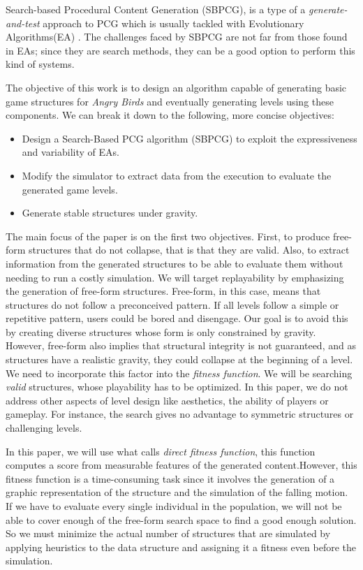 \documentclass[a4paper,twoside]{article}
\begin{document}
Search-based Procedural Content Generation (SBPCG), is a type of a \textit{generate-and-test} approach to PCG which is usually tackled with Evolutionary Algorithms(EA) \cite{togelius2010search}. The challenges faced by SBPCG are not far from those found in EAs; since they are search
methods, they can be a good option to perform this kind of systems. 


The objective of this work is to design an algorithm capable of
generating basic game structures for \textit{Angry Birds} and
eventually generating levels using these components. We can break it
down to the following, more concise objectives: 

\begin{itemize}
	\item Design a Search-Based PCG algorithm (SBPCG) to exploit the expressiveness and variability of EAs.
	\item Modify the simulator to extract data from the execution to evaluate the generated game levels.
	\item Generate stable structures under gravity.
\end{itemize} 


The main focus of the paper is on the first two objectives. First, to produce free-form structures that do not collapse, that is that they are valid. Also, to extract information from the generated structures to be able to evaluate them without needing to run a costly simulation.  We will target replayability by emphasizing the generation of free-form structures. Free-form, in this case, means that structures do not follow a preconceived pattern. If all levels follow a simple or repetitive pattern, users could be bored and disengage. Our goal is to avoid this by creating diverse structures whose form is only constrained by gravity. However, free-form also implies that structural integrity is not guaranteed, and as structures have a realistic gravity, they could collapse at the beginning of a level. We need to incorporate this factor into the \textit{fitness function}.  We will be searching { \em valid} structures, whose playability has to be optimized.  In this paper, we do not address other aspects of level design like aesthetics, the ability of players or gameplay. For instance, the search gives no advantage to symmetric structures or challenging levels.

In this paper, we will use what \cite{togelius2010search} calls {\em direct fitness function}, this function computes a score from measurable features of the generated content.However, this fitness function is a time-consuming task since it involves the generation of a graphic representation of the structure and the simulation of the falling motion. If we have to evaluate every single individual in the population, we will not be able to cover enough of the free-form search space to find a good enough solution. So we must minimize the actual number of structures that are simulated by applying heuristics to the data structure and assigning it a fitness even before the simulation.
\end{document}
